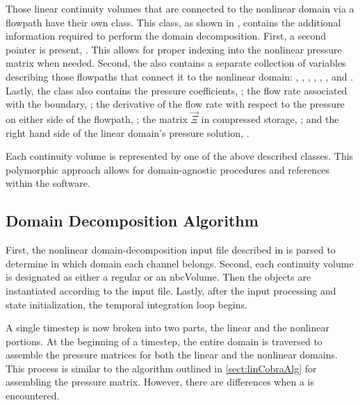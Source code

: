 Those linear continuity volumes that are connected to the nonlinear domain via a flowpath have their own  class.
This class, as shown in , contains the additional information required to perform the domain decomposition.
First, a second  pointer is present, .
This allows for proper indexing into the nonlinear pressure matrix when needed.
Second, the  also contains a separate collection of variables describing those flowpaths that connect it to the nonlinear domain: , , , , , , and .
Lastly, the  class also contains the pressure coefficients, ; the flow rate associated with the boundary, ; the derivative of the flow rate with respect to the pressure on either side of the flowpath, ; the matrix $\vec{\Xi}$ in compressed storage, ; and the right hand side of the linear domain's pressure solution, .

Each continuity volume is represented by one of the above described  classes.
This polymorphic approach allows for domain-agnostic procedures and references within the software.

\subsection{Domain Decomposition Algorithm}
\label{subsect:domDecompAlgorithm}

First, the nonlinear domain-decomposition input file described in  is parsed to determine in which domain each channel belongs.
Second, each continuity volume is designated as either a regular  or an {nbcVolume}.
Then the   objects are instantiated according to the \cobra{} input file.
Lastly, after the input processing and state initialization, the temporal integration loop begins.

A single timestep is now broken into two parts, the linear and the nonlinear portions.
At the beginning of a timestep, the entire domain is traversed to assemble the pressure matrices for both the linear and the nonlinear domains.
This process is similar to the algorithm outlined in \ref{sect:linCobraAlg} for assembling the pressure matrix.
However, there are differences when a  is encountered.

